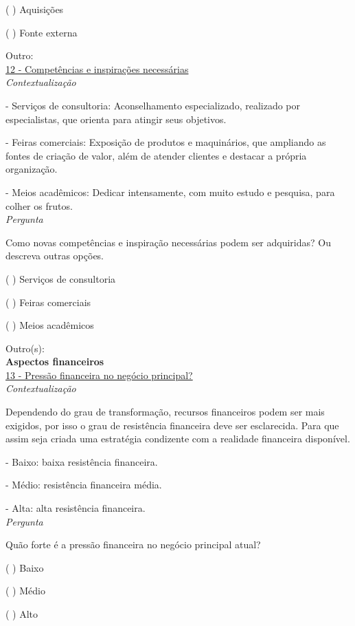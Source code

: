 ( ) Aquisições

( ) Fonte externa

Outro:\\


\underline{12 - Competências e inspirações necessárias}\\

\textit{Contextualização}

- Serviços de consultoria: Aconselhamento especializado, realizado por especialistas, que orienta para atingir seus objetivos.

- Feiras comerciais: Exposição de produtos e maquinários, que ampliando as fontes de criação de valor, além de atender clientes e destacar a própria organização.

- Meios acadêmicos: Dedicar intensamente, com muito estudo e pesquisa, para colher os frutos.\\


\textit{Pergunta}

Como novas competências e inspiração necessárias podem ser adquiridas? Ou descreva outras opções.

( ) Serviços de consultoria

( ) Feiras comerciais

( ) Meios acadêmicos

Outro(s):\\


\textbf{Aspectos financeiros}\\

\underline{13 - Pressão financeira no negócio principal?}\\

\textit{Contextualização}

Dependendo do grau de transformação, recursos financeiros podem ser mais exigidos, por isso o grau de resistência financeira deve ser esclarecida. Para que assim seja criada uma estratégia condizente com a realidade financeira disponível.

- Baixo: baixa resistência financeira.

- Médio: resistência financeira média.

- Alta: alta resistência financeira.\\


\textit{Pergunta}

Quão forte é a pressão financeira no negócio principal atual?

( ) Baixo

( ) Médio

( ) Alto\\


